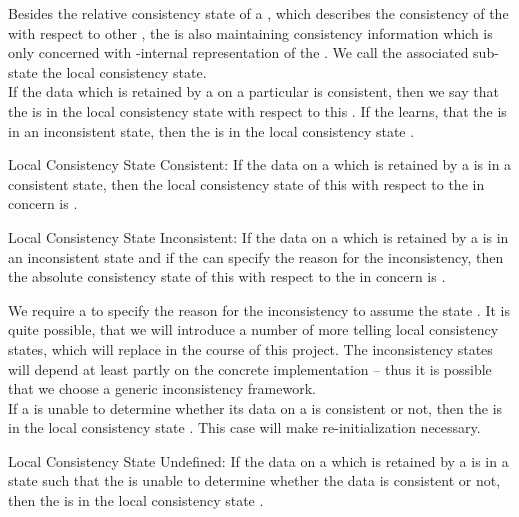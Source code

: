 \documentclass[a4paper, 12pt]{book}
\begin{document}
Besides the relative consistency state of a , which
describes the consistency of the  with respect to other
, the \SYNEIGHT is also maintaining consistency
information which is only concerned with -internal
representation of the . We call the associated sub-state
the local consistency state.\\
%
If the data which is retained by a  on a particular
 is consistent, then we say that the  is in
the local consistency state \revabsconstateCONSISTENT with respect to
this . If the  learns, that the 
is in an inconsistent state, then the  is in the local
consistency state \revabsconstateINCONSISTENT.
%
\begin{definition*}{Local Consistency State Consistent: \revabsconstateCONSISTENT}
  If the data on a  which is retained by a 
  is in a consistent state, then the local consistency state of
  this  with respect to the  in concern is
  \revabsconstateCONSISTENT. 
\end{definition*}
%
\begin{definition*}{Local Consistency State Inconsistent: \revabsconstateINCONSISTENT}
  If the data on a  which is retained by a 
  is in an inconsistent state and if the  can specify the
  reason for the inconsistency, then the absolute consistency state of
  this  with respect to the  in concern is
  \revabsconstateINCONSISTENT.
\end{definition*}
%
We require a  to specify the reason for the inconsistency
to assume the state \revabsconstateINCONSISTENT. It is quite possible,
that we will introduce a number of more telling local consistency
states, which will replace \revabsconstateINCONSISTENT in the course
of this project.
%
The inconsistency states will depend at least partly on the  concrete
implementation -- thus it is possible that we choose a generic
inconsistency framework.\\
%
If a  is unable to determine whether its
data on a  is consistent or not, then the 
is in the local consistency state \revabsconstateUNDEFINED. This
case will make re-initialization necessary. 
%
\begin{definition*}{Local Consistency State Undefined: \revabsconstateUNDEFINED}
  If the data on a  which is retained by a 
  is in a state such that the  is unable to determine
  whether the data is consistent or not, then the  is in
  the local consistency state \revabsconstateUNDEFINED.
\end{definition*}
\end{document}

